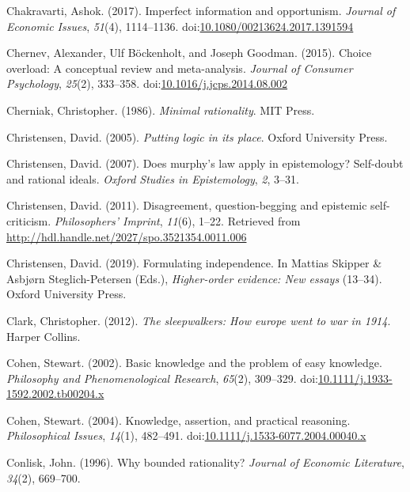 \documentclass[
  12pt,
  letterpaper,
]{scrbook}
\newlength{\cslhangindent}
\newenvironment{CSLReferences}[2] %
 {\begin{list}{}{%
  \setlength{\itemindent}{0pt}
  \setlength{\leftmargin}{0pt}
  \setlength{\parsep}{0pt}
  \ifodd #1
   \setlength{\leftmargin}{\cslhangindent}
   \setlength{\itemindent}{-1\cslhangindent}
  \fi
  \setlength{\itemsep}{#2\baselineskip}}}
 {\end{list}}
\begin{document}
\begin{CSLReferences}{1}{0}
Chakravarti, Ashok. (2017). Imperfect information and opportunism.
\emph{Journal of Economic Issues}, \emph{51}(4), 1114--1136.
doi:\href{https://doi.org/10.1080/00213624.2017.1391594}{10.1080/00213624.2017.1391594}

Chernev, Alexander, Ulf Böckenholt, and Joseph Goodman. (2015). Choice
overload: A conceptual review and meta-analysis. \emph{Journal of
Consumer Psychology}, \emph{25}(2), 333--358.
doi:\href{https://doi.org/10.1016/j.jcps.2014.08.002}{10.1016/j.jcps.2014.08.002}

Cherniak, Christopher. (1986). \emph{Minimal rationality}. MIT Press.

Christensen, David. (2005). \emph{Putting logic in its place}. Oxford
University Press.

Christensen, David. (2007). Does murphy's law apply in epistemology?
Self-doubt and rational ideals. \emph{Oxford Studies in Epistemology},
\emph{2}, 3--31.

Christensen, David. (2011). Disagreement, question-begging and epistemic
self-criticism. \emph{Philosophers' Imprint}, \emph{11}(6), 1--22.
Retrieved from \url{http://hdl.handle.net/2027/spo.3521354.0011.006}

Christensen, David. (2019). Formulating independence. In Mattias Skipper
\& Asbjørn Steglich-Petersen (Eds.), \emph{Higher-order evidence: New
essays} (13--34). Oxford University Press.

Clark, Christopher. (2012). \emph{The sleepwalkers: How europe went to
war in 1914}. Harper Collins.

Cohen, Stewart. (2002). Basic knowledge and the problem of easy
knowledge. \emph{Philosophy and Phenomenological Research},
\emph{65}(2), 309--329.
doi:\href{https://doi.org/10.1111/j.1933-1592.2002.tb00204.x}{10.1111/j.1933-1592.2002.tb00204.x}

Cohen, Stewart. (2004). Knowledge, assertion, and practical reasoning.
\emph{Philosophical Issues}, \emph{14}(1), 482--491.
doi:\href{https://doi.org/10.1111/j.1533-6077.2004.00040.x}{10.1111/j.1533-6077.2004.00040.x}

Conlisk, John. (1996). Why bounded rationality? \emph{Journal of
Economic Literature}, \emph{34}(2), 669--700.


\end{CSLReferences}
\end{document}
